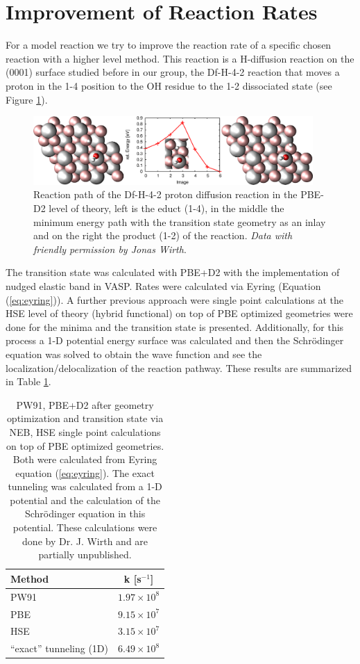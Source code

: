 \documentclass[11pt,DIV=13,BCOR=5mm,a4paper,headinclude]{scrbook}
\begin{document}
\section{Improvement of Reaction Rates}\label{crystal_calc}
For a model reaction we try to improve the reaction rate of a specific chosen reaction with a higher level method.
This reaction is a H-diffusion reaction on the (0001) surface studied before in our group, the Df-H-4-2 reaction\cite{WirthJPCC2012} that moves a proton in the 1-4 position to the OH residue to the 1-2 dissociated state (see Figure \ref{abb:df-h-4-2}).
\begin{figure}[h]
\centering
\includegraphics[width=0.95\textwidth]{figures/0001/NEB-path/df-h-4-2.pdf}
\caption{Reaction path of the Df-H-4-2 proton diffusion reaction in the PBE-D2 level of theory, left is the educt (1-4), in the middle the minimum energy path with the transition state geometry as an inlay and on the right the product (1-2) of the reaction.
\textit{Data with friendly permission by Jonas Wirth}.}
       \label{abb:df-h-4-2}
\end{figure}
The transition state was calculated with PBE+D2 with the implementation of nudged elastic band in VASP.
Rates were calculated via Eyring (Equation (\ref{eq:eyring})).
A further previous approach were single point calculations at the HSE level of theory (hybrid functional) on top of PBE optimized geometries were done for the minima and the transition state is presented.
Additionally, for this process a 1-D potential energy surface was calculated and then the Schrödinger equation was solved to obtain the wave function and see the localization/delocalization of the reaction pathway.
These results are summarized in Table \ref{tab:4-2results_jonas}.
\begin{table}[!h]
  \centering
  \caption{PW91, PBE+D2 after geometry optimization and transition state via NEB, HSE single point calculations on top of PBE optimized geometries.
Both were calculated from Eyring equation (\ref{eq:eyring}).
The exact tunneling was calculated from a 1-D potential and the calculation of the Schrödinger equation in this potential.
These calculations were done by Dr. J. Wirth and are partially unpublished.}
\hspace*{-1cm}
 \begin{tabular}{l|c}
 \toprule
 Method&k [s$^{-1}$] \\
    \midrule
 PW91 & $1.97\times 10^8$\\
 PBE & $9.15\times 10^7$\\
 HSE & $3.15\times 10^7$\\
 ``exact'' tunneling (1D) & $6.49\times 10^8$\\\bottomrule
  \end{tabular}
  \label{tab:4-2results_jonas}
\end{table}
\end{document}
